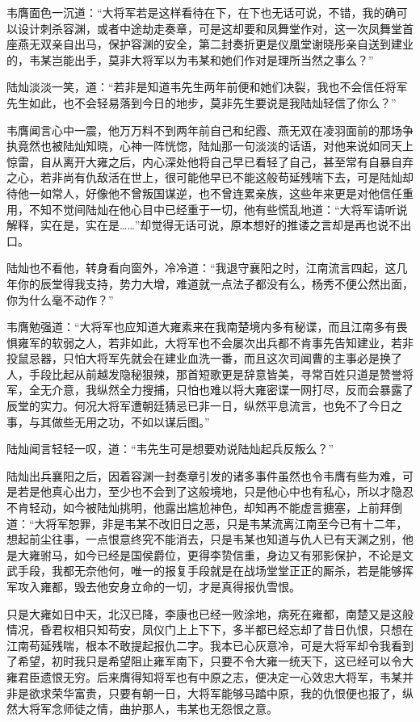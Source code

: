 韦膺面色一沉道：“大将军若是这样看待在下，在下也无话可说，不错，我的确可以设计刺杀容渊，或者中途劫走奏章，可是这却要和凤舞堂作对，这一次凤舞堂首座燕无双亲自出马，保护容渊的安全，第二封奏折更是仪凰堂谢晓彤亲自送到建业的，韦某岂能出手，莫非大将军以为韦某和她们作对是理所当然之事么？”

陆灿淡淡一笑，道：“若非是知道韦先生两年前便和她们决裂，我也不会信任将军先生如此，也不会轻易落到今日的地步，莫非先生要说是我陆灿轻信了你么？”

韦膺闻言心中一震，他万万料不到两年前自己和纪霞、燕无双在凌羽面前的那场争执竟然也被陆灿知晓，心神一阵恍惚，陆灿那一句淡淡的话语，对他来说如同天上惊雷，自从离开大雍之后，内心深处他将自己早已看轻了自己，甚至常有自暴自弃之心，若非尚有仇敌活在世上，很可能他早已不能这般苟延残喘下去，可是陆灿却待他一如常人，好像他不曾叛国谋逆，也不曾连累亲族，这些年来更是对他信任重用，不知不觉间陆灿在他心目中已经重于一切，他有些慌乱地道：“大将军请听说解释，实在是，实在是……”却觉得无话可说，原本想好的推诿之言却是再也说不出口。

陆灿也不看他，转身看向窗外，冷冷道：“我退守襄阳之时，江南流言四起，这几年你的辰堂得我支持，势力大增，难道就一点法子都没有么，杨秀不便公然出面，你为什么毫不动作？”

韦膺勉强道：“大将军也应知道大雍素来在我南楚境内多有秘谍，而且江南多有畏惧雍军的软弱之人，若非如此，大将军也不会屡次出兵都不肯事先告知建业，若非投鼠忌器，只怕大将军先就会在建业血洗一番，而且这次司闻曹的主事必是换了人，手段比起从前越发隐秘狠辣，那首短歌更是辞意皆美，寻常百姓只道是赞誉将军，全无介意，我纵然全力搜捕，只怕也难以将大雍密谍一网打尽，反而会暴露了辰堂的实力。何况大将军遭朝廷猜忌已非一日，纵然平息流言，也免不了今日之事，与其做些无用之功，不如以谋后图。”

陆灿闻言轻轻一叹，道：“韦先生可是想要劝说陆灿起兵反叛么？”

陆灿出兵襄阳之后，因着容渊一封奏章引发的诸多事件虽然也令韦膺有些为难，可是若是他真心出力，至少也不会到了这般境地，只是他心中也有私心，所以才隐忍不肯轻动，如今被陆灿挑明，他露出尴尬神色，却知再不能虚言搪塞，上前拜倒道：“大将军恕罪，非是韦某不改旧日之恶，只是韦某流离江南至今已有十二年，想起前尘往事，一点恨意终究不能消去，只是韦某也知道与仇人已有天渊之别，他是大雍驸马，如今已经是国侯爵位，更得李贽信重，身边又有邪影保护，不论是文武手段，我都无奈他何，唯一的报复手段就是在战场堂堂正正的厮杀，若是能够挥军攻入雍都，毁去他安身立命的一切，才是真得报仇雪恨。

只是大雍如日中天，北汉已降，李康也已经一败涂地，病死在雍都，南楚又是这般情况，昏君权相只知苟安，凤仪门上上下下，多半都已经忘却了昔日仇恨，只想在江南苟延残喘，根本不敢提起报仇二字。我本已心灰意冷，可是大将军却令我看到了希望，初时我只是希望阻止雍军南下，只要不令大雍一统天下，这已经可以令大雍君臣遗恨无穷。后来膺得知将军也有中原之志，便决定一心效忠大将军，韦某并非是欲求荣华富贵，只要有朝一日，大将军能够马踏中原，我的仇恨便也报了，纵然大将军念师徒之情，曲护那人，韦某也无怨恨之意。

